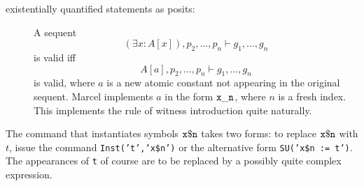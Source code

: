 \documentclass[12pt]{book}
\begin{document}
\begin{description}
\item[existentially quantified statements as posits:]

A sequent $$(\exists x:A[x]),p_2,\ldots,p_n \vdash g_1,\ldots,g_n$$ is valid iff $$A[a],p_2,\ldots,p_n \vdash g_1,\ldots,g_n$$ is valid, where $a$ is a new atomic constant not appearing in the original sequent.  Marcel implements $a$ in the form ${\tt x\_n}$, where $n$ is a fresh index.  This implements the rule of witness introduction quite naturally.

\end{description}

The command that instantiates symbols ${\tt x\$n}$ takes two forms:  to replace ${\tt x\$n}$ with $t$, issue the command {\tt Inst('t','x\$n')}  or the alternative form
{\tt SU('x\$n := t')}.   The appearances of {\tt t} of course are to be replaced by a possibly quite complex expression.

\newpage

\printindex
\end{document}
